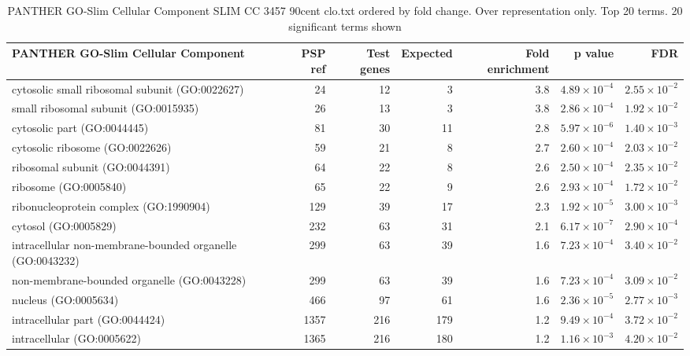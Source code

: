 \begin{table}[ht]
\centering
\begin{adjustbox}{width=\textwidth}

\begin{tabular}{lrrrrrr}
  \hline
PANTHER GO-Slim Cellular Component & PSP ref & Test genes & Expected & Fold enrichment & p value & FDR \\ 
  \hline
cytosolic small ribosomal subunit (GO:0022627) & 24 & 12 & 3 & 3.8 & $4.89 \times 10^{-4}$ & $2.55 \times 10^{-2}$ \\ 
  small ribosomal subunit (GO:0015935) & 26 & 13 & 3 & 3.8 & $2.86 \times 10^{-4}$ & $1.92 \times 10^{-2}$ \\ 
  cytosolic part (GO:0044445) & 81 & 30 & 11 & 2.8 & $5.97 \times 10^{-6}$ & $1.40 \times 10^{-3}$ \\ 
  cytosolic ribosome (GO:0022626) & 59 & 21 & 8 & 2.7 & $2.60 \times 10^{-4}$ & $2.03 \times 10^{-2}$ \\ 
  ribosomal subunit (GO:0044391) & 64 & 22 & 8 & 2.6 & $2.50 \times 10^{-4}$ & $2.35 \times 10^{-2}$ \\ 
  ribosome (GO:0005840) & 65 & 22 & 9 & 2.6 & $2.93 \times 10^{-4}$ & $1.72 \times 10^{-2}$ \\ 
  ribonucleoprotein complex (GO:1990904) & 129 & 39 & 17 & 2.3 & $1.92 \times 10^{-5}$ & $3.00 \times 10^{-3}$ \\ 
  cytosol (GO:0005829) & 232 & 63 & 31 & 2.1 & $6.17 \times 10^{-7}$ & $2.90 \times 10^{-4}$ \\ 
  intracellular non-membrane-bounded organelle (GO:0043232) & 299 & 63 & 39 & 1.6 & $7.23 \times 10^{-4}$ & $3.40 \times 10^{-2}$ \\ 
  non-membrane-bounded organelle (GO:0043228) & 299 & 63 & 39 & 1.6 & $7.23 \times 10^{-4}$ & $3.09 \times 10^{-2}$ \\ 
  nucleus (GO:0005634) & 466 & 97 & 61 & 1.6 & $2.36 \times 10^{-5}$ & $2.77 \times 10^{-3}$ \\ 
  intracellular part (GO:0044424) & 1357 & 216 & 179 & 1.2 & $9.49 \times 10^{-4}$ & $3.72 \times 10^{-2}$ \\ 
  intracellular (GO:0005622) & 1365 & 216 & 180 & 1.2 & $1.16 \times 10^{-3}$ & $4.20 \times 10^{-2}$ \\ 
   \hline
\end{tabular}
\end{adjustbox}
\caption{PANTHER GO-Slim Cellular Component SLIM CC 3457 90cent clo.txt ordered by fold change. Over representation only. Top 20 terms. 20 significant terms shown} 
\label{tab:PANTHER GO-Slim Cellular Component SLIM CC 3457 90cent clo.txt ordered by fold change. Over representation only. Top 20 terms. 20 significant terms shown}
\end{table}


